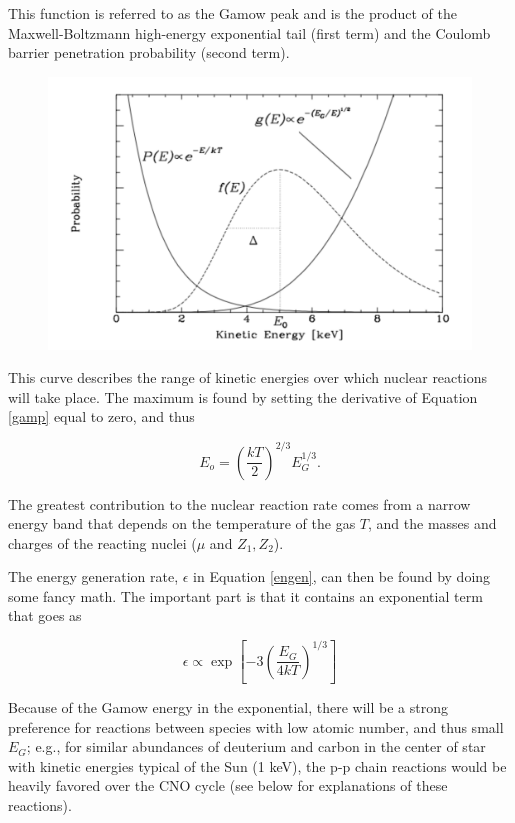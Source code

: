 This function is referred to as the Gamow peak and is the product of the Maxwell-Boltzmann high-energy exponential tail (first term) and the Coulomb barrier penetration probability (second term).

\begin{figure}[h!]
\begin{center}
\includegraphics[width=.9\textwidth]{gamow_peak.pdf}
\end{center}
\end{figure}

This curve describes the range of kinetic energies over which nuclear reactions will take place.  The maximum is found by setting the derivative of Equation \ref{gamp} equal to zero, and thus

\begin{equation}
E_{o} = \left( \frac{kT}{2} \right)^{2/3} E_{G}^{1/3}.
\end{equation}

The greatest contribution to the nuclear reaction rate comes from a narrow energy band that depends on the temperature of the gas $T$, and the masses and charges of the reacting nuclei ($\mu$ and $Z_{1},Z_{2}$).

The energy generation rate, $\epsilon$ in Equation \ref{engen}, can then be found by doing some fancy math.  The important part is that it contains an exponential term that goes as 

\begin{equation}
\epsilon \propto \exp \left[ -3 \left( \frac{E_{G}}{4kT}\right)^{1/3} \right]
\end{equation}

Because of the Gamow energy in the exponential, there will be a strong preference for reactions between species with low atomic number, and thus small $E_{G}$; e.g., for similar abundances of deuterium and carbon in the center of star with kinetic energies typical of the Sun (1 keV), the p-p chain reactions would be heavily favored over the CNO cycle (see below for explanations of these reactions).

